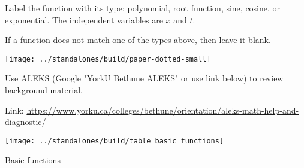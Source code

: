 \documentclass[../main.tex]{subfiles}
\begin{document}
\begin{example}
  Label the function with its type: polynomial, root function, sine, cosine, or exponential. The independent variables are \(x\) and \(t\). %

  \begin{figure}[h!]  %
    \centering
  \end{figure}
\end{example}
If a function does not match one of the types above, then leave it blank.

\texttt{[image: ../standalones/build/paper-dotted-small]}

Use ALEKS (Google "YorkU Bethune ALEKS" or use link below) to review background material.

Link: \url{https://www.yorku.ca/colleges/bethune/orientation/aleks-math-help-and-diagnostic/}

\clearpage

\begin{table}[h]  %
  \centering
  \texttt{[image: ../standalones/build/table\_basic\_functions]}
  \caption{Basic functions}
  \label{table:basic_functions}
\end{table}
\end{document}
